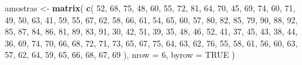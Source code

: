 \documentclass[
  portuguese,
  11pt,
  openany]{book}
\newenvironment{Shaded}{\begin{snugshade}}{\end{snugshade}}
\newcommand{\AttributeTok}[1]{\textcolor[rgb]{0.13,0.29,0.53}{#1}}
\newcommand{\ConstantTok}[1]{\textcolor[rgb]{0.56,0.35,0.01}{#1}}
\newcommand{\DecValTok}[1]{\textcolor[rgb]{0.00,0.00,0.81}{#1}}
\newcommand{\FunctionTok}[1]{\textcolor[rgb]{0.13,0.29,0.53}{\textbf{#1}}}
\newcommand{\NormalTok}[1]{#1}
\newcommand{\OtherTok}[1]{\textcolor[rgb]{0.56,0.35,0.01}{#1}}
\begin{document}
\begin{Shaded}
\begin{Highlighting}[]
\NormalTok{amostras }\OtherTok{\textless{}{-}} \FunctionTok{matrix}\NormalTok{(}
  \FunctionTok{c}\NormalTok{(}
    \DecValTok{52}\NormalTok{, }\DecValTok{68}\NormalTok{, }\DecValTok{75}\NormalTok{, }\DecValTok{48}\NormalTok{, }\DecValTok{60}\NormalTok{, }\DecValTok{55}\NormalTok{, }\DecValTok{72}\NormalTok{, }\DecValTok{81}\NormalTok{, }\DecValTok{64}\NormalTok{, }\DecValTok{70}\NormalTok{, }\DecValTok{45}\NormalTok{, }\DecValTok{69}\NormalTok{, }\DecValTok{74}\NormalTok{, }\DecValTok{60}\NormalTok{, }\DecValTok{71}\NormalTok{,}
    \DecValTok{49}\NormalTok{, }\DecValTok{50}\NormalTok{, }\DecValTok{63}\NormalTok{, }\DecValTok{41}\NormalTok{, }\DecValTok{59}\NormalTok{, }\DecValTok{55}\NormalTok{, }\DecValTok{67}\NormalTok{, }\DecValTok{62}\NormalTok{, }\DecValTok{58}\NormalTok{, }\DecValTok{66}\NormalTok{, }\DecValTok{61}\NormalTok{, }\DecValTok{54}\NormalTok{, }\DecValTok{65}\NormalTok{, }\DecValTok{60}\NormalTok{, }\DecValTok{57}\NormalTok{,}
    \DecValTok{80}\NormalTok{, }\DecValTok{82}\NormalTok{, }\DecValTok{85}\NormalTok{, }\DecValTok{79}\NormalTok{, }\DecValTok{90}\NormalTok{, }\DecValTok{88}\NormalTok{, }\DecValTok{92}\NormalTok{, }\DecValTok{85}\NormalTok{, }\DecValTok{87}\NormalTok{, }\DecValTok{84}\NormalTok{, }\DecValTok{86}\NormalTok{, }\DecValTok{81}\NormalTok{, }\DecValTok{89}\NormalTok{, }\DecValTok{83}\NormalTok{, }\DecValTok{91}\NormalTok{,}
    \DecValTok{30}\NormalTok{, }\DecValTok{42}\NormalTok{, }\DecValTok{51}\NormalTok{, }\DecValTok{39}\NormalTok{, }\DecValTok{35}\NormalTok{, }\DecValTok{48}\NormalTok{, }\DecValTok{46}\NormalTok{, }\DecValTok{52}\NormalTok{, }\DecValTok{41}\NormalTok{, }\DecValTok{37}\NormalTok{, }\DecValTok{45}\NormalTok{, }\DecValTok{43}\NormalTok{, }\DecValTok{38}\NormalTok{, }\DecValTok{44}\NormalTok{, }\DecValTok{36}\NormalTok{,}
    \DecValTok{69}\NormalTok{, }\DecValTok{74}\NormalTok{, }\DecValTok{70}\NormalTok{, }\DecValTok{66}\NormalTok{, }\DecValTok{68}\NormalTok{, }\DecValTok{72}\NormalTok{, }\DecValTok{71}\NormalTok{, }\DecValTok{73}\NormalTok{, }\DecValTok{65}\NormalTok{, }\DecValTok{67}\NormalTok{, }\DecValTok{75}\NormalTok{, }\DecValTok{64}\NormalTok{, }\DecValTok{63}\NormalTok{, }\DecValTok{62}\NormalTok{, }\DecValTok{76}\NormalTok{,}
    \DecValTok{55}\NormalTok{, }\DecValTok{58}\NormalTok{, }\DecValTok{61}\NormalTok{, }\DecValTok{56}\NormalTok{, }\DecValTok{60}\NormalTok{, }\DecValTok{63}\NormalTok{, }\DecValTok{57}\NormalTok{, }\DecValTok{62}\NormalTok{, }\DecValTok{64}\NormalTok{, }\DecValTok{59}\NormalTok{, }\DecValTok{65}\NormalTok{, }\DecValTok{66}\NormalTok{, }\DecValTok{68}\NormalTok{, }\DecValTok{67}\NormalTok{, }\DecValTok{69}
\NormalTok{  ),}
  \AttributeTok{nrow =} \DecValTok{6}\NormalTok{,}
  \AttributeTok{byrow =} \ConstantTok{TRUE}
\NormalTok{)}
\end{Highlighting}
\end{Shaded}
\end{document}
